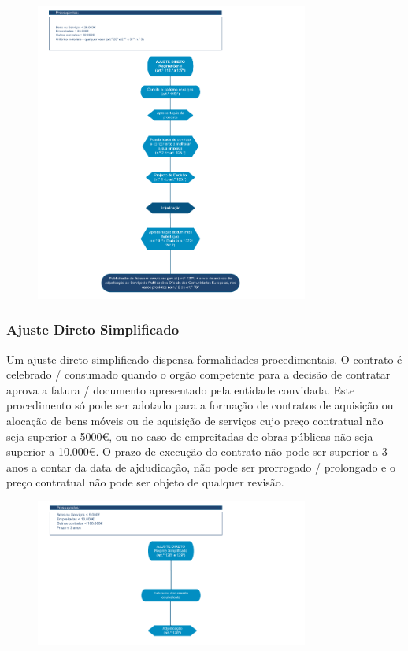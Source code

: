 \documentclass{book}
\begin{document}
	\begin{figure}[H]
		\centering
		\includegraphics[width=0.8\textwidth]{ajuste_direto_ccp.png}
		\caption{}
		\label{}
	\end{figure}
	
		
	\newpage
	
	\subsubsection{Ajuste Direto Simplificado}
	
	Um ajuste direto simplificado dispensa formalidades procedimentais. O contrato é celebrado / consumado quando o orgão competente para a decisão de contratar aprova a fatura / documento apresentado pela entidade convidada. Este procedimento só pode ser adotado para a formação de contratos de aquisição ou alocação de bens móveis ou de aquisição de serviços cujo preço contratual não seja superior a 5000€, ou no caso de empreitadas de obras públicas não seja superior a 10.000€.  O prazo de execução do contrato não pode ser superior a 3 anos a contar da data de ajdudicação, não pode ser prorrogado / prolongado e o preço contratual não pode ser objeto de qualquer revisão. 
	
	
	
	\begin{figure}[H]
		\centering
		\includegraphics[width=0.8\textwidth]{ajuste_direto_simplificado_ccp.png}
		\caption{}
		\label{}
	\end{figure}
	
\end{document}
